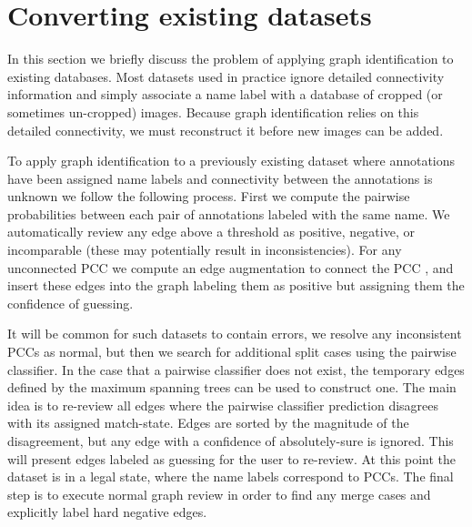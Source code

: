 


\section{Converting existing datasets}\label{sec:rename}

In this section we briefly discuss the problem of applying graph identification to existing databases. Most
datasets used in practice ignore detailed connectivity information and simply associate a name label with a
database of cropped (or sometimes un-cropped) images. Because graph identification relies on this detailed
connectivity, we must reconstruct it before new images can be added.

To apply graph identification to a previously existing dataset where annotations have been assigned name labels and
connectivity between the annotations is unknown we follow the following process. First we compute the pairwise
probabilities between each pair of annotations labeled with the same name. We automatically review any edge above a
threshold as positive, negative, or incomparable (these may potentially result in inconsistencies). For any
unconnected PCC we compute an edge augmentation to connect the PCC
\cite{eswaran_augmentation_1976,khuller_approximation_1993}, and insert these edges into the graph labeling them as
positive but assigning them the confidence of guessing.

It will be common for such datasets to contain errors, we resolve any inconsistent PCCs as normal, but then we
search for additional split cases using the pairwise classifier. In the case that a pairwise classifier does not
exist, the temporary edges defined by the maximum spanning trees can be used to construct one. The main idea is to
re-review all edges where the pairwise classifier prediction disagrees with its assigned match-state. Edges are
sorted by the magnitude of the disagreement, but any edge with a confidence of absolutely-sure is ignored. This
will present edges labeled as guessing for the user to re-review. At this point the dataset is in a legal state,
where the name labels correspond to PCCs. The final step is to execute normal graph review in order to find any
merge cases and explicitly label hard negative edges.

